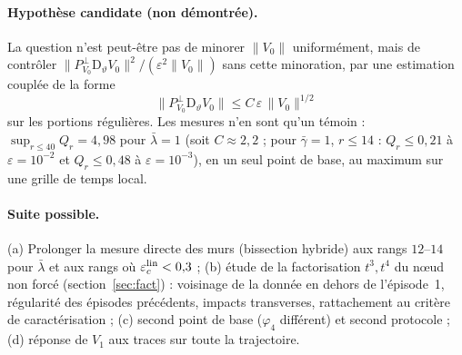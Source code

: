 \documentclass[11pt,a4paper]{article}
\theoremstyle{remark}
\newcommand{\vth}{\vartheta}
\newcommand{\D}{\mathrm D}
\begin{document}
\paragraph{Hypoth\`ese candidate (non d\'emontr\'ee).} La question n'est peut-\^etre pas de minorer $\lVert V_0\rVert$ uniform\'ement, mais de contr\^oler $\lVert P^\perp_{V_0}\D_\vth V_0\rVert^2/(\varepsilon^2\lVert V_0\rVert)$ sans cette minoration, par une estimation coupl\'ee de la forme
\[ \lVert P^\perp_{V_0}\D_\vth V_0\rVert\le C\,\varepsilon\,\lVert V_0\rVert^{1/2} \]
sur les portions r\'eguli\`eres. Les mesures n'en sont qu'un t\'emoin : $\sup_{r\le40}Q_r=4{,}98$ pour $\bar\lambda=1$ (soit $C\approx2{,}2$ ; pour $\bar\gamma=1$, $r\le14$ : $Q_r\le0{,}21$ \`a $\varepsilon=10^{-2}$ et $Q_r\le0{,}48$ \`a $\varepsilon=10^{-3}$), en un seul point de base, au maximum sur une grille de temps local.

\paragraph{Suite possible.} (a) Prolonger la mesure directe des murs (bissection hybride) aux rangs $12$--$14$ pour $\bar\lambda$ et aux rangs o\`u $\varepsilon_c^{\rm lin}<0{,}3$ ; (b) \'etude de la factorisation $t^3,t^4$ du n\oe ud non forc\'e (section~\ref{sec:fact}) : voisinage de la donn\'ee en dehors de l'\'episode~1, r\'egularit\'e des \'episodes pr\'ec\'edents, impacts transverses, rattachement au crit\`ere de caract\'erisation ; (c) second point de base ($\varphi_4$ diff\'erent) et second protocole ; (d) r\'eponse de $V_1$ aux traces sur toute la trajectoire.
\end{document}

